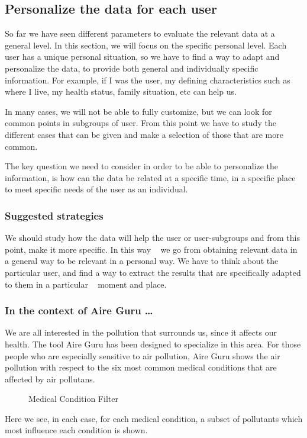 \subsection{Personalize the data for each user}
So far we have seen different parameters to evaluate the relevant data at a general level. In this section, we will focus on the specific personal level.
Each user has a unique personal situation, so we have to find a way to adapt and personalize the data, to provide both general and individually specific information.
For example, if I was the user, my defining characteristics such as where I live,
my health status, family situation, etc can help us.

In many cases, we will not be able to fully customize, but we can look for common points in subgroups of
user. From this point we have to study the different cases that can be given and make a selection of those that are
more common.

The key question we need to consider in order to be able to personalize the information, is how can the data be related at a specific time, in a specific place to meet specific needs of the
user as an individual.

\subsubsection*{Suggested strategies} 

We should study how the data will help the user or user-subgroups and from this point, make it more specific. In this way
  we go from obtaining relevant data in a general way to be relevant in a personal way. We have to think about the
  particular user, and find a way to extract the results that are specifically adapted to them in a particular
  moment and place.

\subsubsection*{In the context of Aire Guru \ldots} 
 We are all interested in the pollution that surrounds us, since it affects our health. The tool
 Aire Guru has been designed to specialize in this area. For those people who are especially sensitive to air pollution, Aire Guru shows the air pollution with respect to the six most common medical conditions that
 are affected by air pollutans.
 

\begin{figure}[ht]
    \centering
    \hfill
    \hfill
  
  \caption{Medical Condition Filter}
    \end{figure}
  Here we see, in each case, for each medical condition, a subset of pollutants which most influence each condition is shown.
    
